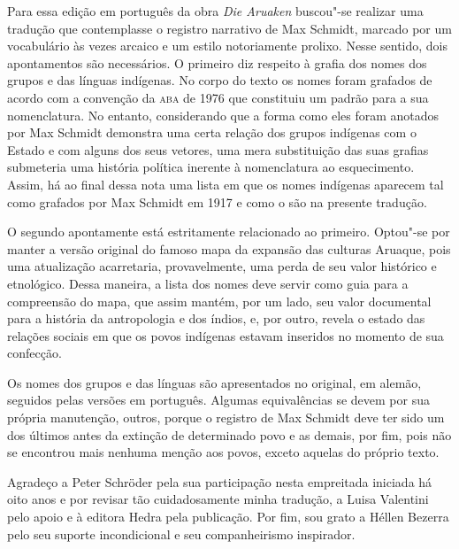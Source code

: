 \noindent{}Para essa edição em português da obra \emph{Die Aruaken} buscou"-se
realizar uma tradução que contemplasse o registro narrativo de Max
Schmidt, marcado por um vocabulário às vezes arcaico e um estilo
notoriamente prolixo. Nesse sentido, dois apontamentos são necessários.
O primeiro diz respeito à grafia dos nomes dos grupos e das línguas
indígenas. No corpo do texto os nomes foram grafados de acordo com a
convenção da \textsc{aba} de 1976 que constituiu um padrão para a sua
nomenclatura. No entanto, considerando que a forma como eles foram
anotados por Max Schmidt demonstra uma certa relação dos grupos
indígenas com o Estado e com alguns dos seus vetores, uma mera
substituição das suas grafias submeteria uma história política inerente
à nomenclatura ao esquecimento. Assim, há ao final dessa nota uma lista
em que os nomes indígenas aparecem tal como grafados por Max Schmidt em
1917 e como o são na presente tradução.

O segundo apontamente está estritamente relacionado ao primeiro.
Optou"-se por manter a versão original do famoso mapa da expansão das
culturas Aruaque, pois uma atualização acarretaria, provavelmente, uma
perda de seu valor histórico e etnológico. Dessa maneira, a lista dos
nomes deve servir como guia para a compreensão do mapa, que assim
mantém, por um lado, seu valor documental para a história da
antropologia e dos índios, e, por outro, revela o estado das relações
sociais em que os povos indígenas estavam inseridos no momento de sua
confecção.

Os nomes dos grupos e das línguas são apresentados no original, em
alemão, seguidos pelas versões em português. Algumas equivalências se
devem por sua própria manutenção, outros, porque o registro de Max
Schmidt deve ter sido um dos últimos antes da extinção de determinado
povo e as demais, por fim, pois não se encontrou mais nenhuma menção aos
povos, exceto aquelas do próprio texto.

Agradeço a Peter Schröder pela sua participação nesta empreitada
iniciada há oito anos e por revisar tão cuidadosamente minha tradução, a
Luisa Valentini pelo apoio e à editora Hedra pela publicação. Por fim,
sou grato a Héllen Bezerra pelo seu suporte incondicional e seu
companheirismo inspirador.

